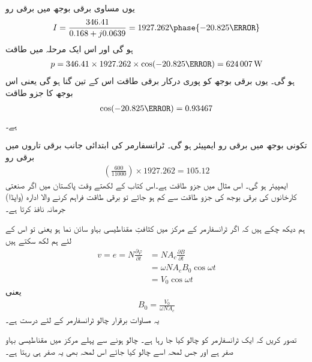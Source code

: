 یوں مساوی برقی بوجھ میں برقی رو
\begin{align*}
I=\frac{346.41}{0.168+j0.0639}=1927.262\phase{-20.825\degree}
\end{align*}
ہو گی اور اس ایک مرحلہ میں طاقت
\begin{align*}
p=346.41 \times 1927.262 \times \cos (-20.825\degree)=\SI{624007}{\watt}
\end{align*}
ہو گی۔ یوں برقی بوجھ کو پوری درکار برقی طاقت اس کے تین گنا ہو گی یعنی   اس بوجھ کا جزو طاقت 
\begin{align*}
\cos (-20.825\degree)=0.93467
\end{align*}
ہے۔

	تکونی بوجھ   میں برقی رو  ایمپیئر ہو گی۔ ٹرانسفارمر کی ابتدائی جانب برقی تاروں میں برقی رو
\begin{align*}
\left(\frac{600}{11000} \right) \times 1927.262=105.12
\end{align*}
  ایمپیئر ہو گی۔
%
اس مثال میں جزو طاقت  ہے۔اس کتاب کے لکھتے وقت پاکستان میں اگر صنعتی کارخانوں کی برقی بوجھ کی جزو طاقت  سے کم ہو جائے تو برقی طاقت فراہم کرنے والا ادارہ (واپڈا) جرمانہ نافذ کرتا ہے۔ 

ہم دیکھ چکے ہیں کہ اگر ٹرانسفارمر کے مرکز میں کثافتِ مقناطیسی بہاو سائن نما ہو یعنی   تو اس کے لئے ہم لکھ سکتے ہیں
\begin{align*}
v=e=N \frac{\partial \varphi}{\partial t}&=N A_c \frac{\partial B}{\partial t}\\
&=\omega N A_c B_0 \cos \omega t\\
&=V_0 \cos \omega t
\end{align*}
یعنی
\begin{align}\label{مساوات_ٹرانسفارمر_درکار_کثافت_بہاو}
B_0=\frac{V_0}{\omega N A_c}
\end{align}
یہ مساوات برقرار چالو ٹرانسفارمر کے لئے درست ہے۔

تصور کریں کہ ایک ٹرانسفارمر کو چالو کیا جا رہا ہے۔ چالو ہونے سے پہلے مرکز میں مقناطیسی بہاو صفر ہے اور جس لمحہ اسے چالو کیا جائے اس لمحہ بھی یہ صفر ہی رہتا ہے۔	

